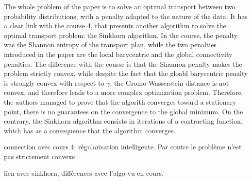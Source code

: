 \documentclass[a4paper,11pt]{article}
\begin{document}
The whole problem of the paper is to solve an optimal transport between two probability distributions, with a penalty adapted to the nature of the data. 
It has a clear link with the course 4, that presents another algorithm to solve the optimal transport problem: the Sinkhorn algorithm.
In the course, the penalty was the Shannon entropy of the transport plan, while the two penalties introduced in the paper are the local barycentric and the global connectivity penalties.
The difference with the course is that the Shannon penalty makes the problem strictly convex, while despite the fact that the gloabl barycentric penalty is strongly convex with respect to $\gamma$, the Gromo-Wasserstein distance is not convex, and therefore leads to a more complex optimization problem.
Therefore, the authors managed to prove that the algorith converges toward a stationary point, there is no guarantees on the convergence to the global minimum.
On the contrary, the Sinkhorn algorithm consists in iterations of a contracting function, which has as a consequence that the algorithm converges. 


connection avec cours 4: régularisation intelligente. 
Par contre le problème n'est pas strictement convexe

lien avec sinkhorn, différences avec l'algo vu en cours. 


\newpage
\printbibliography
\end{document}
